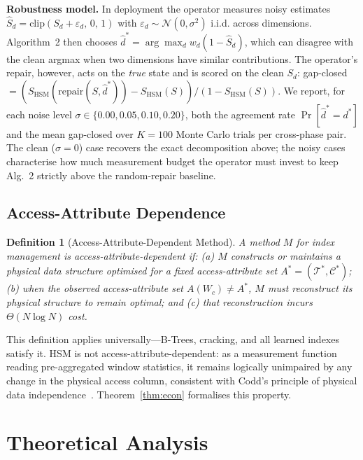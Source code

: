 \documentclass[10pt,journal,compsoc]{IEEEtran}
\newtheorem{definition}{Definition}
\newcommand{\SHSM}{S_{\mathrm{HSM}}}
\begin{document}
\smallskip\noindent\textbf{Robustness model.}
In deployment the operator measures noisy estimates
$\hat S_d = \mathrm{clip}(S_d+\varepsilon_d,\,0,\,1)$ with
$\varepsilon_d\!\sim\!\mathcal{N}(0,\sigma^2)$ i.i.d. across dimensions.
Algorithm~2 then chooses
$\hat d^{*}=\arg\max_d w_d(1-\hat S_d)$, which can disagree with the
clean argmax when two dimensions have similar contributions. The
operator's repair, however, acts on the \emph{true} state and is scored
on the clean $S_d$: gap-closed
$=(\SHSM(\mathrm{repair}(S,\hat d^{*}))-\SHSM(S))/(1-\SHSM(S))$.
We report, for each noise level
$\sigma\in\{0.00,0.05,0.10,0.20\}$, both the agreement rate
$\Pr[\hat d^{*}\!=\!d^{*}]$ and the mean gap-closed over $K=100$ Monte
Carlo trials per cross-phase pair. The clean ($\sigma\!=\!0$)
case recovers the exact decomposition above; the noisy cases
characterise how much measurement budget the operator must invest
to keep Alg.~2 strictly above the random-repair baseline.

\subsection{Access-Attribute Dependence}

\begin{definition}[Access-Attribute-Dependent Method]
A method $M$ for index management is \emph{access-attribute-dependent} if:
(a) $M$ constructs or maintains a physical data structure optimised for a
fixed access-attribute set $A^*\!=\!(\mathcal{T}^*,\mathcal{C}^*)$;
(b) when the observed access-attribute set $A(W_c)\neq A^*$, $M$ must
reconstruct its physical structure to remain optimal; and
(c) that reconstruction incurs $\Theta(N\log N)$ cost.
\end{definition}

This definition applies universally---B-Trees, cracking, and all learned
indexes satisfy it. HSM is not access-attribute-dependent: as a
measurement function reading pre-aggregated window statistics, it remains
logically unimpaired by any change in the physical access column,
consistent with Codd's principle of physical data
independence~\cite{Codd1970Relational}. Theorem~\ref{thm:econ}
formalises this property.

\section{Theoretical Analysis}
\end{document}
